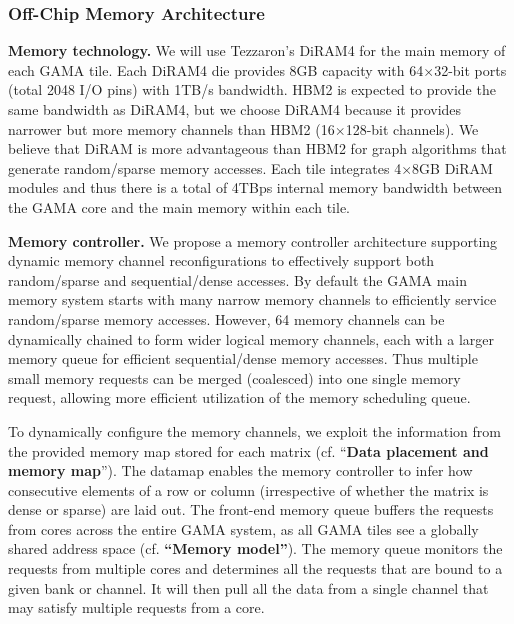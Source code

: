 \subsubsection{Off-Chip Memory Architecture} 
\label{sec:memory:off-chip}
\noindent
\textbf{Memory technology.} 
We will use  Tezzaron's DiRAM4 for the main memory of each GAMA tile.  
Each DiRAM4 die provides 8GB capacity with 64$\times$32-bit ports (total 2048 I/O pins) with 1TB/s bandwidth. 
HBM2 is expected to provide the same bandwidth as DiRAM4, but we choose DiRAM4 because it provides narrower but more memory channels than HBM2 (16$\times$128-bit channels). 
We believe that DiRAM is more advantageous than HBM2 for graph algorithms that generate random/sparse memory accesses. 
Each tile integrates 4$\times$8GB DiRAM modules and thus there is a total of 4TBps internal memory bandwidth between the GAMA core and the main memory within each tile. 


\vspace{3pt}
\noindent
\textbf{Memory controller.} 
We propose a memory controller architecture supporting dynamic memory channel reconfigurations to effectively support both random/sparse and sequential/dense accesses.
By default the GAMA main memory system starts with many narrow memory channels to efficiently service random/sparse memory accesses.
However, %
64 memory channels can be dynamically chained to form wider logical memory channels, each with a larger memory queue for efficient sequential/dense memory accesses.
Thus multiple small memory requests can be merged (coalesced) into one single memory request, allowing more efficient utilization of the memory scheduling queue.


To dynamically configure the memory channels, we exploit the information from the provided memory map stored for each matrix (cf. ``\textbf{Data placement and memory map}'').
The datamap enables the memory controller to infer how consecutive elements of a row or column (irrespective of whether the matrix is dense or sparse) are laid out. 
The front-end memory queue buffers the requests from cores across the entire GAMA system, as all GAMA tiles see a globally shared address space (cf. \textbf{``Memory model''}). 
The memory queue monitors the requests from multiple cores and determines all the requests that are bound to a given bank or channel. 
It will then pull all the data from a single channel that may satisfy multiple requests from a core.  


